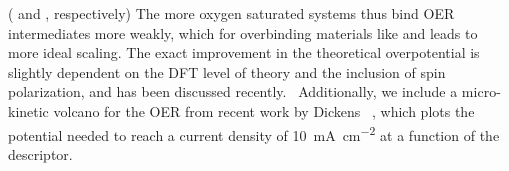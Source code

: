( and , respectively)
%
The more oxygen saturated \IrOthree systems thus bind OER intermediates more weakly, which for overbinding materials like \IrOtwo and \RhOtwo leads to more ideal scaling.
%
The exact improvement in the theoretical overpotential is slightly dependent on the DFT level of theory and the inclusion of spin polarization, and has been discussed recently.~\cite{Seitz2016,Strickler2019}
%
Additionally, we include a micro-kinetic volcano for the OER from recent work by Dickens ~\cite{Dickens2019},
which plots the potential needed to reach a current density of
\SI[mode=text]{10}{\mA\per\cm\squared}
at a function of the \DGOmOH descriptor.
%
%
%
